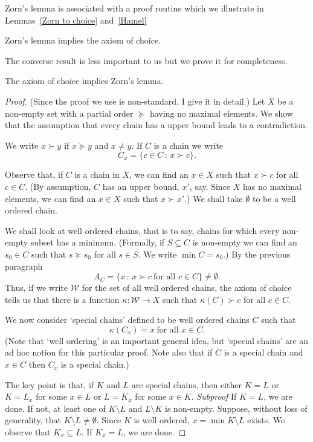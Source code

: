 Zorn's lemma is associated with a proof routine
which we illustrate in Lemmas~\ref{Zorn to choice}
and~\ref{Hamel}
\begin{lemma}\label{Zorn to choice} Zorn's lemma implies the axiom of choice.
\end{lemma}
The converse result is less important to us
but we prove it for completeness.
\begin{lemma}\label{choice to Zorn} The axiom of choice
implies Zorn's lemma.
\end{lemma}
\begin{proof} (Since the proof we use is non-standard,
I give it in detail.)
Let $X$ be a non-empty set with a partial order $\succeq$
having no maximal elements. We show that the assumption
that every chain has a upper bound leads to a contradiction.

We write $x\succ y$ if $x\succeq y$ and $x\neq y$.
If $C$ is a chain we write 
\[C_{x}=\{c\in C\,:\,x\succ c\}.\]

Observe that, if $C$ is a chain in $X$, we can
find an $x\in X$ such that $x\succ c$ for all $c\in C$.
(By assumption, $C$ has an upper bound, $x'$, say.
Since $X$ has no maximal elements, we can find an 
$x\in X$ such that $x\succ x'$.) We shall take
$\emptyset$ to be a well ordered chain. 

We shall look at well ordered chains, that is to say,
chains for which every non-empty subset has a minimum.
(Formally, if $S\subseteq C$ is non-empty we can
find an $s_{0}\in C$ such that $s\succeq s_{0}$
for all $s\in S$. We write $\min C=s_{0}$.)
By the previous paragraph 
\[A_{C}=\{x\,:\,x\succ c\ \text{for all $c\in C$}\}\neq\emptyset.\]
Thus, if we write ${\mathcal W}$ for the set of all well
ordered chains, the axiom of choice tells us that
there is a function $\kappa:{\mathcal W}\rightarrow X$
such that $\kappa(C)\succ c$ for all $c\in C$.

We now consider `special chains' defined to be
well ordered chains $C$ such that
\[\kappa(C_{x})=x\ \text{for all $x\in C$}.\]
(Note that `well ordering' is an important general
idea, but `special chains' are an ad hoc notion
for this particular proof. Note also that if $C$
is a special chain and $x\in C$ then $C_{x}$ is a special
chain.)

The key point is that, if $K$ and $L$ are special
chains, then either $K=L$ or $K=L_{x}$ for some $x\in L$
or $L=K_{x}$ for some $x\in K$.
\newline\emph{Subproof} If $K=L$, we are done. If not, at
least one of $K\setminus L$ and $L\setminus K$ is non-empty.
Suppose, without loss of generality, that $K\setminus L\neq \emptyset$.
Since $K$ is well ordered, $x=\min K\setminus L$ exists.
We observe that $K_{x}\subseteq L$. If $K_{x}=L$, we are done.


\end{proof}

